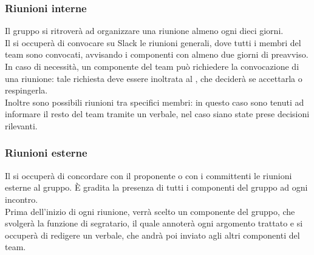 	\subsubsection{Riunioni interne}
	Il gruppo si ritroverà ad organizzare una riunione almeno ogni dieci giorni. \\
	Il \RES si occuperà di convocare su Slack le riunioni generali, dove tutti i membri del team sono convocati, avvisando i componenti con almeno due giorni di preavviso. \\
	In caso di necessità, un componente del team può richiedere la convocazione di una riunione: tale richiesta deve essere inoltrata al \RES, che deciderà se accettarla o respingerla. \\
	Inoltre sono possibili riunioni tra specifici membri: in questo caso sono tenuti ad informare il resto del team tramite un verbale, nel caso siano state prese decisioni rilevanti. \\
	\subsubsection{Riunioni esterne}
	Il \RES si occuperà di concordare con il proponente o con i committenti le riunioni esterne al gruppo. È gradita la presenza di tutti i componenti del gruppo ad ogni incontro. \\
	Prima dell'inizio di ogni riunione, verrà scelto un componente del gruppo, che svolgerà la funzione di segratario, il quale annoterà ogni argomento trattato e si occuperà di redigere un verbale, che andrà poi inviato agli altri componenti del team.